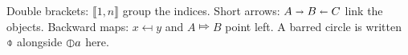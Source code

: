 \documentclass{article}
\begin{document}
Double brackets: $\llbracket 1, n \rrbracket$ group the indices.
Short arrows: $A \shortrightarrow B \shortleftarrow C$ link the objects.
Backward maps: $x \mapsfrom y$ and $A \Mapsto B$ point left.
A barred circle is written $\obar$ alongside $\varobar{a}$ here.
\end{document}
